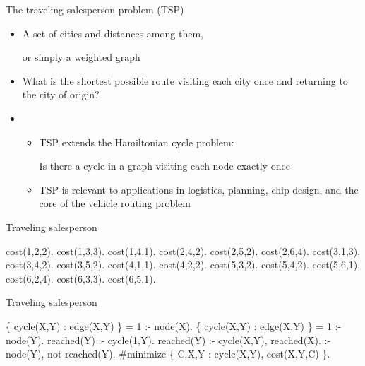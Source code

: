 %
\begin{frame}[c]{The traveling salesperson problem (TSP)}
  \begin{itemize}
  \item {} A set of cities and distances among them,

    or simply a weighted graph
    \smallskip
  \item {} What is the shortest possible route visiting each city once and returning to the city of origin?
    \bigskip
  \item<2-> 
    \begin{itemize}
    \item TSP extends the Hamiltonian cycle problem:
      \par
      Is there a cycle in a graph visiting each node exactly once
      \smallskip
    \item TSP is relevant to applications in logistics, planning, chip design,
      and the core of the vehicle routing problem
    \end{itemize}
  \end{itemize}
\end{frame}
\begin{frame}[fragile]{Traveling salesperson}
\pause
\begin{semiverbatim}

\pause[3]
cost(1,2,2).  cost(1,3,3).  cost(1,4,1).
cost(2,4,2).  cost(2,5,2).  cost(2,6,4).
cost(3,1,3).  cost(3,4,2).  cost(3,5,2).
cost(4,1,1).  cost(4,2,2).
cost(5,3,2).  cost(5,4,2).  cost(5,6,1).
cost(6,2,4).  cost(6,3,3).  cost(6,5,1).


\end{semiverbatim}
\end{frame}
\begin{frame}[fragile,c]{Traveling salesperson}
\begin{semiverbatim}
\{ cycle(X,Y) : edge(X,Y) \} = 1 :- node(X).
\{ cycle(X,Y) : edge(X,Y) \} = 1 :- node(Y).
\pause
reached(Y) :- cycle(1,Y).
reached(Y) :- cycle(X,Y), reached(X).
\pause
:- node(Y), not reached(Y).
\pause
#minimize \{ C,X,Y : cycle(X,Y), cost(X,Y,C) \}.
\end{semiverbatim}
\end{frame}
%

